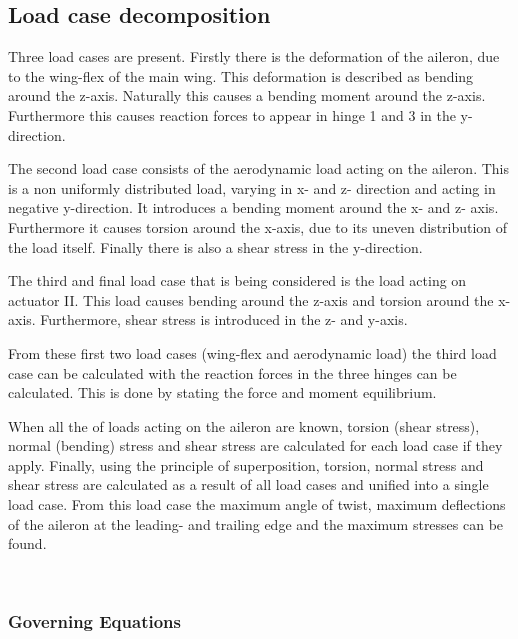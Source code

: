 \subsection{Load case decomposition}
\label{subsec:load_decomposition}
Three load cases are present. Firstly there is the deformation of the aileron, due to the wing-flex of the main wing. This deformation is described as bending around the z-axis. Naturally this causes a bending moment around the z-axis. Furthermore this causes reaction forces to appear in hinge 1 and 3 in the y-direction.

\par
The second load case consists of the aerodynamic load acting on the aileron. This is a non uniformly distributed load, varying in x- and z- direction and acting in negative y-direction. It introduces a bending moment around the x- and z- axis. Furthermore it causes torsion around the x-axis, due to its uneven distribution of the load itself. Finally there is also a shear stress in the y-direction.
\par
The third and final load case that is being considered is the load acting on actuator II. This load causes bending around the z-axis and torsion around the x-axis. Furthermore, shear stress is introduced in the z- and y-axis.
\par
From these first two load cases (wing-flex and aerodynamic load) the third load case can be calculated with the reaction forces in the three hinges can be calculated. This is done by stating the force and moment equilibrium.

When all the of loads acting on the aileron are known, torsion (shear stress), normal (bending) stress and shear stress are calculated for each load case if they apply. Finally, using the principle of superposition, torsion, normal stress and shear stress are calculated as a result of all load cases and unified into a single load case. From this load case the maximum angle of twist, maximum deflections of the aileron at the leading- and trailing edge and the maximum stresses can be found.

\

\subsubsection{Governing Equations}
\label{subsubsec:gov_eq_numerical}

